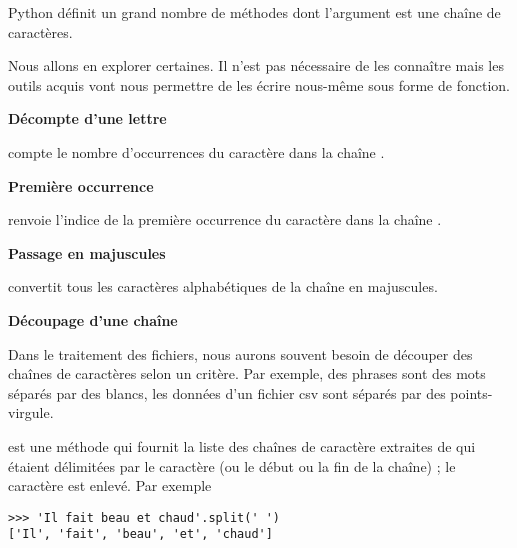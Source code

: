 \medskip

Python définit un grand nombre de méthodes dont l'argument est une chaîne de caractères. 

Nous allons en explorer certaines. Il n'est pas nécessaire de les connaître mais les outils acquis vont nous permettre de les écrire nous-même sous forme de fonction.
\begin{description}
    \item {\bf Décompte d'une lettre}
    
     compte le nombre d’occurrences du caractère  dans la chaîne . 
\item{\bf Première occurrence}

 renvoie l'indice de la première occurrence du caractère  dans la chaîne .
\item{\bf Passage en majuscules}

 convertit tous les caractères alphabétiques de la chaîne  en majuscules.
\item{\bf Découpage d'une chaîne}

Dans le traitement des fichiers, nous aurons souvent besoin de découper des chaînes de caractères selon un critère. Par exemple, des phrases sont des mots séparés par des blancs, les données d'un fichier {\sc csv} sont séparés par des points-virgule. 

 est une méthode qui fournit la liste des chaînes de caractère extraites de  qui étaient délimitées par le caractère  (ou le début ou la fin de la chaîne) ; le caractère  est enlevé. Par exemple 
\begin{lstlisting}
>>> 'Il fait beau et chaud'.split(' ')
['Il', 'fait', 'beau', 'et', 'chaud']
\end{lstlisting}
\end{description}
